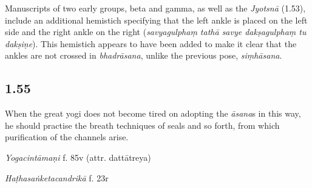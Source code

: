 \begin{ekdosis}
\begin{philcomm}[hp01_053]
Manuscripts of two early groups, beta and gamma, as well as the \emph{Jyotsnā} (1.53), include an additional hemistich specifying that the left ankle is placed on the left side and the right ankle on the right (\emph{savyagulphaṃ tathā savye dakṣagulphaṃ tu dakṣiṇe}). This hemistich appears to have been added to make it clear that the ankles are not crossed in \emph{bhadrāsana}, unlike the previous pose, \emph{siṃhāsana}.

\end{philcomm}





\subsection*{1.55}
\begin{translation}[hp01_055]
When the great yogi does not become tired on adopting the \emph{āsana}s in this way, he should  practise the breath techniques of seals and so forth, from which purification of the channels arise.
\end{translation}


\begin{testimonia}[hp01_055]
\emph{Yogacintāmaṇi} f. 85v (attr. dattātreya)

\begin{versinnote}
\end{versinnote}

\emph{Haṭhasaṅketacandrikā} f. 23r


\end{testimonia}
\end{ekdosis}
